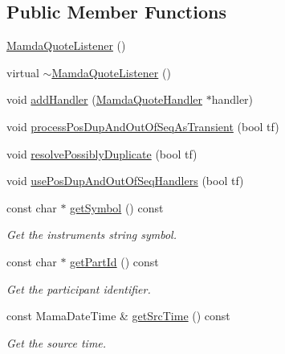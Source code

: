 \subsection*{Public Member Functions}
\begin{CompactItemize}
\item 
\hyperlink{classWombat_1_1MamdaQuoteListener_56668574b9fb979163182cda591364e2}{Mamda\-Quote\-Listener} ()
\item 
virtual \hyperlink{classWombat_1_1MamdaQuoteListener_163781eff5c0f36fac9f5288ca1a6929}{$\sim$Mamda\-Quote\-Listener} ()
\item 
void \hyperlink{classWombat_1_1MamdaQuoteListener_4576a9bd2d264d2072a9825eabc348f1}{add\-Handler} (\hyperlink{classWombat_1_1MamdaQuoteHandler}{Mamda\-Quote\-Handler} $\ast$handler)
\item 
void \hyperlink{classWombat_1_1MamdaQuoteListener_7a4ec42c2a90846db4f55e74d41e456c}{process\-Pos\-Dup\-And\-Out\-Of\-Seq\-As\-Transient} (bool tf)
\item 
void \hyperlink{classWombat_1_1MamdaQuoteListener_1ab499ae23c87f687a7b27d4de0a52df}{resolve\-Possibly\-Duplicate} (bool tf)
\item 
void \hyperlink{classWombat_1_1MamdaQuoteListener_7daf84de8c0a48b6a227ef4f2c819991}{use\-Pos\-Dup\-And\-Out\-Of\-Seq\-Handlers} (bool tf)
\item 
const char $\ast$ \hyperlink{classWombat_1_1MamdaQuoteListener_e94788daaae88602911d3b1a5b9ae3aa}{get\-Symbol} () const 
\begin{CompactList}\small\item\em Get the instruments string symbol. \item\end{CompactList}\item 
const char $\ast$ \hyperlink{classWombat_1_1MamdaQuoteListener_7d1a662d35580eaf5d03260c977999a6}{get\-Part\-Id} () const 
\begin{CompactList}\small\item\em Get the participant identifier. \item\end{CompactList}\item 
const Mama\-Date\-Time \& \hyperlink{classWombat_1_1MamdaQuoteListener_3632c2277d9c0a6bf0882f484966f71c}{get\-Src\-Time} () const 
\begin{CompactList}\small\item\em Get the source time. \item\end{CompactList}\item 

\end{CompactItemize}
